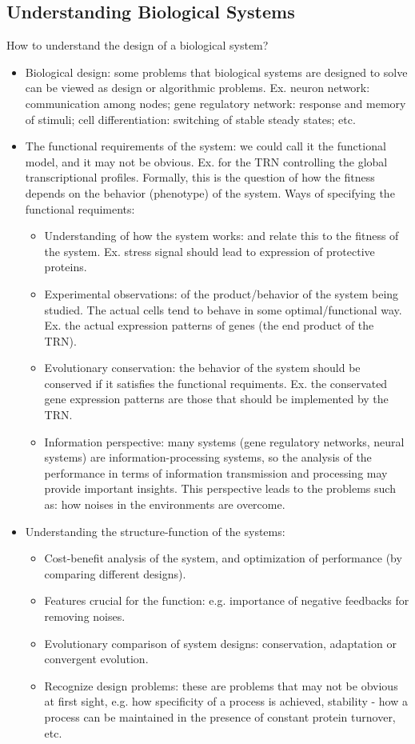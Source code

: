 \documentclass{report}
\begin{document}
\subsection{Understanding Biological Systems}

How to understand the design of a biological system?  
\begin{itemize}
\item Biological design: some problems that biological systems are designed to solve can be viewed as design or algorithmic problems. Ex. neuron network: communication among nodes; gene regulatory network: response and memory of stimuli; cell differentiation: switching of stable steady states; etc. 

\item The functional requirements of the system: we could call it the functional model, and it may not be obvious. Ex. for the TRN controlling the global transcriptional profiles. Formally, this is the question of how the fitness depends on the behavior (phenotype) of the system. Ways of specifying the functional requiments: 
\begin{itemize}
	\item Understanding of how the system works: and relate this to the fitness of the system. Ex. stress signal should lead to expression of protective proteins. 
	\item Experimental observations: of the product/behavior of the system being studied. The actual cells tend to behave in some optimal/functional way. Ex. the actual expression patterns of genes (the end product of the TRN). 
	\item Evolutionary conservation: the behavior of the system should be conserved if it satisfies the functional requiments. Ex. the conservated gene expression patterns are those that should be implemented by the TRN. 
	\item Information perspective: many systems (gene regulatory networks, neural systems) are information-processing systems, so the analysis of the performance in terms of information transmission and processing may provide important insights. This perspective leads to the problems such as: how noises in the environments are overcome. 
\end{itemize}

\item Understanding the structure-function of the systems: 
\begin{itemize}
	\item Cost-benefit analysis of the system, and optimization of performance (by comparing different designs). 
	\item Features crucial for the function: e.g. importance of negative feedbacks for removing noises. 
	\item Evolutionary comparison of system designs: conservation, adaptation or convergent evolution. 
	\item Recognize design problems: these are problems that may not be obvious at first sight, e.g. how specificity of a process is achieved, stability - how a process can be maintained in the presence of constant protein turnover, etc.
\end{itemize}
\end{itemize}
\end{document}
